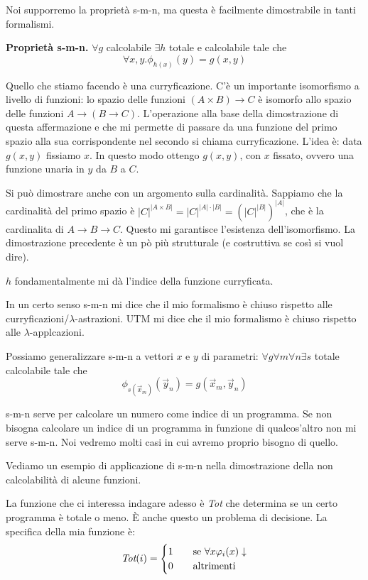 Noi supporremo la proprietà s-m-n, ma questa è facilmente dimostrabile in tanti formalismi.
\begin{thm}
    \textbf{Proprietà s-m-n. } $\forall g$ calcolabile $\exists h$ totale e calcolabile tale che
    \begin{equation*}
        \forall x,y. \phi_{h(x)}(y) = g(x,y)
    \end{equation*}
\end{thm}

Quello che stiamo facendo è una curryficazione. C'è un importante isomorfismo a livello di funzioni:
lo spazio delle funzioni $(A \times B) \to C$ è isomorfo allo spazio delle funzioni $A \to (B \to
C)$. L'operazione alla base della dimostrazione di questa affermazione e che mi permette di passare
da una funzione del primo spazio alla sua corrispondente nel secondo si chiama curryficazione.
L'idea è: data $g(x,y)$ fissiamo $x$. In questo modo ottengo $g(x,y)$, con $x$ fissato, ovvero una funzione
unaria in $y$ da $B$ a $C$.

Si può dimostrare anche con un argomento sulla cardinalità. Sappiamo che la cardinalità del primo
spazio è $|C|^{|A \times B|} = |C|^{|A|\cdot|B|} = (|C|^{|B|})^{|A|}$, che è la cardinalita di $A
\to B \to C$. Questo mi garantisce l'esistenza dell'isomorfismo. La dimostrazione precedente è un pò
più strutturale (e costruttiva se così si vuol dire).

$h$ fondamentalmente mi dà l'indice della funzione curryficata.

In un certo senso s-m-n mi dice che il mio formalismo è chiuso rispetto alle
curryficazioni/$\lambda$-astrazioni. UTM mi dice che il mio formalismo è chiuso rispetto alle
$\lambda$-applcazioni.

Possiamo generalizzare s-m-n a vettori $x$ e $y$ di parametri: 
$\forall g \forall m \forall n \exists s$ totale calcolabile tale che
\begin{equation*}
    \phi_{s(\vec{x}_{m})}(\vec{y}_{n}) = g(\vec{x}_{m},\vec{y}_{n})
\end{equation*}

s-m-n serve per calcolare un numero come indice di un programma. Se non bisogna calcolare un indice
di un programma in funzione di qualcos'altro non mi serve s-m-n. Noi vedremo molti casi in cui
avremo proprio bisogno di quello.

Vediamo un esempio di applicazione di s-m-n nella dimostrazione della non calcolabilità di alcune
funzioni.

La funzione che ci interessa indagare adesso è \textit{Tot} che determina se un certo programma è
totale o meno. È anche questo un problema di decisione. La specifica della mia funzione è:
\begin{equation*}
    \textit{Tot}(i) =
    \begin{cases}
        1 \quad &\text{se $\forall x \varphi_{i}(x) \downarrow$} \\
        0 \quad &\text{altrimenti}
    \end{cases}
\end{equation*}

